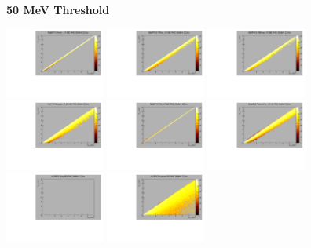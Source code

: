 \textbf{50 MeV Threshold}

\begin{center}

  \includegraphics[width=0.245\textwidth]{plots/response_matrix/Proton_KE_RHC_CCInc_50MeV.pdf}
  \includegraphics[width=0.245\textwidth]{plots/response_matrix/PiPlus_KE_RHC_CCInc_50MeV.pdf}
  \includegraphics[width=0.245\textwidth]{plots/response_matrix/PiMinus_KE_RHC_CCInc_50MeV.pdf}
  \includegraphics[width=0.245\textwidth]{plots/response_matrix/Charged_Pi_KE_RHC_CCInc_50MeV.pdf}
  \includegraphics[width=0.245\textwidth]{plots/response_matrix/Pi0_KE_RHC_CCInc_50MeV.pdf}
  \includegraphics[width=0.245\textwidth]{plots/response_matrix/Proton+Pion_KE_RHC_CCInc_50MeV.pdf}
  \includegraphics[width=0.245\textwidth]{plots/response_matrix/Total_RHC_CCInc_50MeV.pdf}
  \includegraphics[width=0.245\textwidth]{plots/response_matrix/Hadrons_RHC_CCInc_50MeV.pdf}

\end{center}

